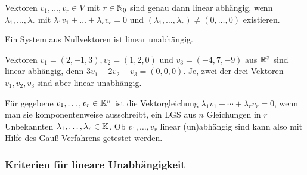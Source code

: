 	Vektoren $ v_1, \ldots, v_r \in V $ mit $ r \in \mathbb N_0 $ sind genau dann linear abhängig, wenn $ \lambda_1, \ldots, \lambda_r $ mit $ \lambda_1v_1 + \ldots + \lambda_rv_r = 0 $ und $ ( \lambda_1, \ldots, \lambda_r ) \neq ( 0, \ldots, 0 ) $ existieren.

	Ein System aus  Nullvektoren ist linear unabhängig.
	
\begin{bsp}
	Vektoren $v_1= (2,-1,3), v_2 = (1,2,0)$ und $v_3 = (-4,7,-9)$ aus $\mathbb R^3$ sind linear abhängig, denn $ 3 v_1 - 2 v_2 + v_3 = (0,0,0)$. Je, zwei der drei Vektoren $v_1, v_2, v_3$ sind aber linear unabhängig. 
\end{bsp} 

\begin{bem}
	Für gegebene $v_1,\ldots,v_r \in \mathbb K^n$ ist die Vektorgleichung $\lambda_1 v_1 + \cdots + \lambda_r v_r = 0$, wenn man sie komponentenweise ausschreibt, ein LGS aus $n$ Gleichungen in $r$ Unbekannten $\lambda_1,\ldots,\lambda_r \in \mathbb K$. Ob $v_1,\ldots,v_r$ linear (un)abhängig sind kann also mit Hilfe des Gauß-Verfahrens getestet werden. 
\end{bem} 


\subsubsection{Kriterien für lineare Unabhängigkeit}

